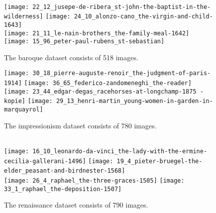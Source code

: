 \begin{figure}
	\centering
	{
        \\
        \texttt{[image: 22\_12\_jusepe-de-ribera\_st-john-the-baptist-in-the-wilderness]}
        \texttt{[image: 24\_10\_alonzo-cano\_the-virgin-and-child-1643]}\\
    }
    {
        \texttt{[image: 21\_11\_le-nain-brothers\_the-family-meal-1642]}
        \texttt{[image: 15\_96\_peter-paul-rubens\_st-sebastian]}\\
    }
	\caption{The baroque dataset consists of 518 images.}
	\label{fig:baroque_style_transfer_dataset}
\end{figure}
\begin{figure}
	\centering
	{
        \texttt{[image: 30\_18\_pierre-auguste-renoir\_the-judgment-of-paris-1914]}
        \texttt{[image: 36\_65\_federico-zandomeneghi\_the-reader]}
    }
    {
        \texttt{[image: 23\_44\_edgar-degas\_racehorses-at-longchamp-1875 - kopie]}
        \texttt{[image: 29\_13\_henri-martin\_young-women-in-garden-in-marquayrol]}
    }
	\caption{The impressionism dataset consists of 780 images.}
	\label{fig:impressionism_style_transfer_dataset}
\end{figure}
\begin{figure}
	\centering
    {
        \\
        \texttt{[image: 16\_10\_leonardo-da-vinci\_the-lady-with-the-ermine-cecilia-gallerani-1496]}
        \texttt{[image: 19\_4\_pieter-bruegel-the-elder\_peasant-and-birdnester-1568]}
    }
    {
        \\
        \texttt{[image: 26\_4\_raphael\_the-three-graces-1505]}
        \texttt{[image: 33\_1\_raphael\_the-deposition-1507]}
        \\
	}
	\caption{The renaissance dataset consists of 790 images.}
	\label{fig:renaissance_style_transfer_dataset}
\end{figure}

